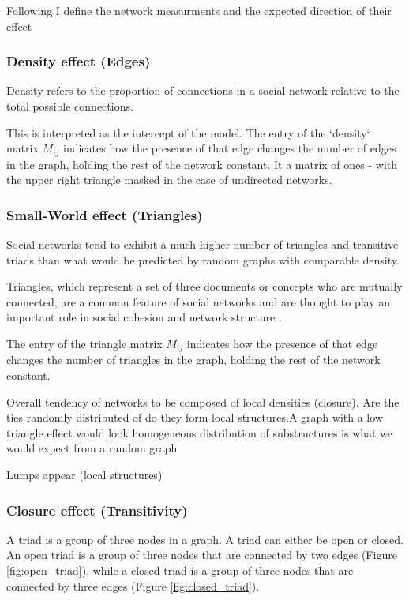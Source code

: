 

Following \citet{jiao2017} I define the network measurments and the expected direction of their effect

\subsubsection{Density effect (Edges)}

Density refers to the proportion of connections in a social network relative to the total possible connections.

This is interpreted as the intercept of the model. The entry of the `density` matrix $M_{ij}$ indicates how the presence of that edge changes the number of edges in the graph, holding the rest of the network constant. It a matrix of ones - with the upper right triangle masked in the case of undirected networks.

\subsubsection{Small-World effect (Triangles)}

Social networks tend to exhibit a much higher number of triangles and transitive triads than what would be predicted by random graphs with comparable density.

Triangles, which represent a set of three documents or concepts who are mutually connected, are a common feature of social networks and are thought to play an important role in social cohesion and network structure \citep{kossinets2006, newman2018}.

The entry of the triangle matrix $M_{ij}$ indicates how the presence of that edge changes the number of triangles in the graph, holding the rest of the network constant. 

Overall tendency of networks to be composed of local densities (closure). Are the ties randomly distributed of do they form local structures.A graph with a low triangle effect would look homogeneous distribution of substructures is what we would expect from a random graph

Lumps appear (local structures)

\subsubsection{Closure effect (Transitivity)}

A triad is a group of three nodes in a graph. A triad can either be open or closed. An open triad is a group of three nodes that are connected by two edges (Figure \ref{fig:open_triad}), while a closed triad is a group of three nodes that are connected by three edges (Figure \ref{fig:closed_triad}). 

